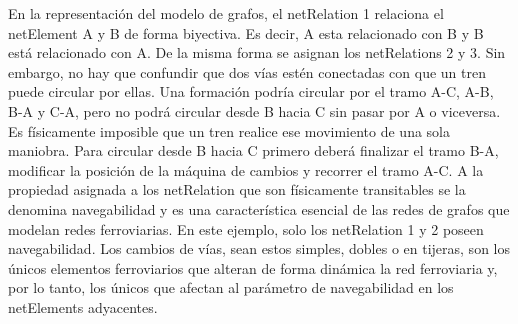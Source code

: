     En la representación del modelo de grafos, el netRelation 1 relaciona el netElement A y B de forma biyectiva. Es decir, A esta relacionado con B y B está relacionado con A. De la misma forma se asignan los netRelations 2 y 3. Sin embargo, no hay que confundir que dos vías estén conectadas con que un tren puede circular por ellas. Una formación podría circular por el tramo A-C, A-B, B-A y C-A, pero no podrá circular desde B hacia C sin pasar por A o viceversa. Es físicamente imposible que un tren realice ese movimiento de una sola maniobra. Para circular desde B hacia C primero deberá finalizar el tramo B-A, modificar la posición de la máquina de cambios y recorrer el tramo A-C. A la propiedad asignada a los netRelation que son físicamente transitables se la denomina navegabilidad y es una característica esencial de las redes de grafos que modelan redes ferroviarias. En este ejemplo, solo los netRelation 1 y 2 poseen navegabilidad. Los cambios de vías, sean estos simples, dobles o en tijeras, son los únicos elementos ferroviarios que alteran de forma dinámica la red ferroviaria y, por lo tanto, los únicos que afectan al parámetro de navegabilidad en los netElements adyacentes.
    
    